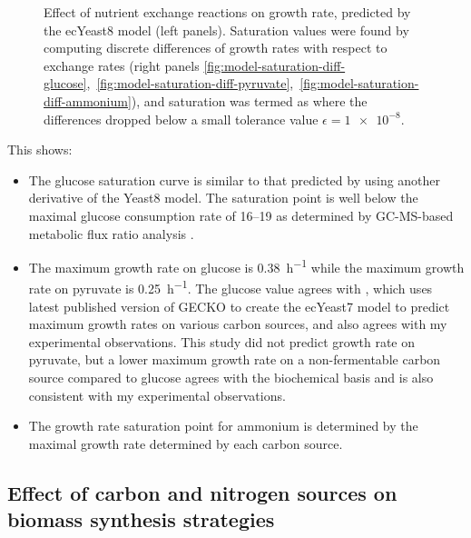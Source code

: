\begin{figure}
  \caption{
    Effect of nutrient exchange reactions on growth rate, predicted by the ecYeast8 model (left panels).
    Saturation values were found by computing discrete differences of growth rates with respect to exchange rates
    (right panels \ref{fig:model-saturation-diff-glucose},~\ref{fig:model-saturation-diff-pyruvate},~\ref{fig:model-saturation-diff-ammonium}),
    and saturation was termed as where the differences dropped below a small tolerance value $\epsilon = \num{1e-8}$.
  }
  \label{fig:model-saturation}
\end{figure}

This shows:
\begin{itemize}
  \item The glucose saturation curve is similar to that predicted by \textcite{elsemmanWholecellModelingYeast2022} using another derivative of the Yeast8 model.
        The saturation point is well below the maximal glucose consumption rate of \SIrange{16}{19}{\mmolgdwh} as determined by GC-MS-based metabolic flux ratio analysis \parencite{blankTCACycleActivity2004}.
  \item The maximum growth rate on glucose is \SI{0.38}{\hour^{-1}} while the maximum growth rate on pyruvate is \SI{0.25}{\hour^{-1}}.
        The glucose value agrees with \textcite{domenzainReconstructionCatalogueGenomescale2022}, which uses latest published version of GECKO to create the ecYeast7 model to predict maximum growth rates on various carbon sources, and also agrees with my experimental observations.
        This study did not predict growth rate on pyruvate, but a lower maximum growth rate on a non-fermentable carbon source compared to glucose agrees with the biochemical basis and is also consistent with my experimental observations.
  \item The growth rate saturation point for ammonium is determined by the maximal growth rate determined by each carbon source.
\end{itemize}

\subsection{Effect of carbon and nitrogen sources on biomass synthesis strategies}
\label{subsec:model-grid}

